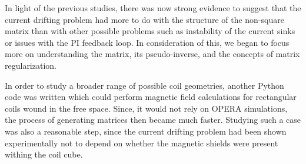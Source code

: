 


In light of the previous studies, there was now strong evidence to
suggest that the current drifting problem had more to do with the
structure of the non-square matrix than with other possible problems
such as instability of the current sinks or issues with the PI
feedback loop.  In consideration of this, we began to focus more on
understanding the matrix, its pseudo-inverse, and the concepts of
matrix regularization.

In order to study a broader range of possible coil geometries, another
Python code was written which could perform magnetic field
calculations for rectangular coils wound in the free space.  Since, it would not
rely on OPERA simulations, the process of generating matrices then
became much faster.  Studying such a case was also a reasonable step,
since the current drifting problem had been shown experimentally not
to depend on whether the magnetic shields were present withing the
coil cube.

